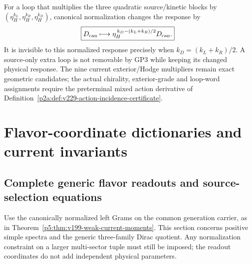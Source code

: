 \documentclass[12pt,a4paper]{article}
\begin{document}

\begin{remark}
\label{p6:rem:v229-canonical-loop-test}
For a loop that multiplies the three quadratic source/kinetic blocks by
$(\eta_H^{k_L},\eta_H^{k_R},\eta_H^{k_D})$, canonical normalization
changes the response by
\[
 \boxed{D_{\rm can}\longmapsto
 \eta_H^{\,k_D-(k_L+k_R)/2}D_{\rm can}.}
\]
It is invisible to this normalized response precisely when
$k_D=(k_L+k_R)/2$.  A source-only extra loop is not removable by
\textup{GP3} while keeping its changed physical response.  The nine
current exterior/Hodge multipliers remain exact geometric candidates;
the actual chirality, exterior-grade and loop-word assignments require
the preterminal mixed action derivative of
Definition~\ref{p2a:def:v229-action-incidence-certificate}.
\end{remark}


\section{Flavor-coordinate dictionaries and current invariants}
\label{p5b:sec:organized-flavor}
\subsection{Complete generic flavor readouts and source-selection equations}
\label{p6:sec:v199-flavor-readouts}
Use the canonically normalized left Grams on the common generation carrier,
as in Theorem~\ref{p5:thm:v199-weak-current-moments}.  This section concerns
positive simple spectra and the generic three-family Dirac quotient.  Any
normalization constraint on a larger multi-sector tuple must still be
imposed; the readout coordinates do not add independent physical parameters.
\end{document}
